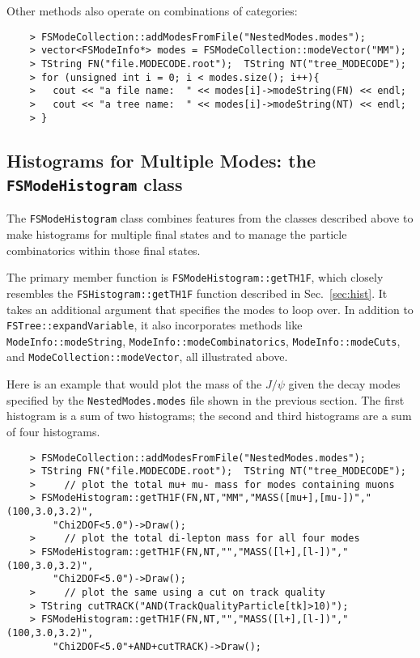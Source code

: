 \documentclass[11pt]{article}
\begin{document}
Other methods also operate on combinations of categories:
\begin{verbatim}
    > FSModeCollection::addModesFromFile("NestedModes.modes");
    > vector<FSModeInfo*> modes = FSModeCollection::modeVector("MM");
    > TString FN("file.MODECODE.root");  TString NT("tree_MODECODE");
    > for (unsigned int i = 0; i < modes.size(); i++){ 
    >   cout << "a file name:  " << modes[i]->modeString(FN) << endl;
    >   cout << "a tree name:  " << modes[i]->modeString(NT) << endl;
    > }
\end{verbatim}


\subsection{Histograms for Multiple Modes: the {\tt FSModeHistogram} class}
\label{sec:modehist}

The {\tt FSModeHistogram} class combines features from the classes described above to make histograms for multiple final states and to manage the particle combinatorics within those final states.

The primary member function is {\tt FSModeHistogram::getTH1F}, which closely resembles the {\tt FSHistogram::getTH1F} function described in Sec.~\ref{sec:hist}.  It takes an additional argument that specifies the modes to loop over.  In addition to {\tt FSTree::expandVariable}, it also incorporates methods like {\tt ModeInfo::modeString}, {\tt ModeInfo::modeCombinatorics}, {\tt ModeInfo::modeCuts}, and {\tt ModeCollection::modeVector}, all illustrated above. 

Here is an example that would plot the mass of the $J/\psi$ given the decay modes specified by the {\tt NestedModes.modes} file shown in the previous section.  The first histogram is a sum of two histograms; the second and third histograms are a sum of four histograms.
\begin{verbatim}
    > FSModeCollection::addModesFromFile("NestedModes.modes");
    > TString FN("file.MODECODE.root");  TString NT("tree_MODECODE");
    >     // plot the total mu+ mu- mass for modes containing muons  
    > FSModeHistogram::getTH1F(FN,NT,"MM","MASS([mu+],[mu-])","(100,3.0,3.2)",
        "Chi2DOF<5.0")->Draw();
    >     // plot the total di-lepton mass for all four modes  
    > FSModeHistogram::getTH1F(FN,NT,"","MASS([l+],[l-])","(100,3.0,3.2)",
        "Chi2DOF<5.0")->Draw();
    >     // plot the same using a cut on track quality
    > TString cutTRACK("AND(TrackQualityParticle[tk]>10)");
    > FSModeHistogram::getTH1F(FN,NT,"","MASS([l+],[l-])","(100,3.0,3.2)",
        "Chi2DOF<5.0"+AND+cutTRACK)->Draw();
\end{verbatim}
\end{document}
